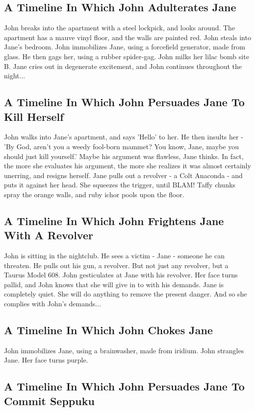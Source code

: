 \documentclass{article}
\begin{document}
\subsection{A Timeline In Which John Adulterates Jane}


John breaks into the apartment with a steel lockpick, and looks around.
The apartment has a mauve vinyl floor, and the walls are painted red.
John steals into Jane's bedroom.
John immobilizes Jane, using a forcefield generator, made from glass.
He then gags her, using a rubber spider{-}gag.
John milks her lilac bomb site B.
Jane cries out in degenerate excitement, and John continues throughout the night...
\subsection{A Timeline In Which John Persuades Jane To Kill Herself}


John walks into Jane's apartment, and says 'Hello' to her.
He then insults her {-} 'By God, aren't you a weedy fool{-}born mammet?
You know, Jane, maybe you should just kill yourself.'
Maybe his argument was flawless, Jane thinks.
In fact, the more she evaluates his argument, the more she realizes it was almost certainly unerring, and resigns herself.
Jane pulls out a revolver {-} a Colt Anaconda {-} and puts it against her head.
She squeezes the trigger, until BLAM!
Taffy chunks spray the orange walls, and ruby ichor pools upon the floor.
\subsection{A Timeline In Which John Frightens Jane With A Revolver}


John is sitting in the nightclub.
He sees a victim {-} Jane {-} someone he can threaten. He pulls out his gun, a revolver.
But not just any revolver, but a Taurus Model 608.
John gesticulates at Jane with his revolver. Her face turns pallid, and John knows that she will give in to with his demands.
Jane is completely quiet. She will do anything to remove the present danger. And so she complies with John's demands...
\subsection{A Timeline In Which John Chokes Jane}


John immobilizes Jane, using a brainwasher, made from iridium.
John strangles Jane.
Her face turns purple.
\subsection{A Timeline In Which John Persuades Jane To Commit Seppuku}
\end{document}
